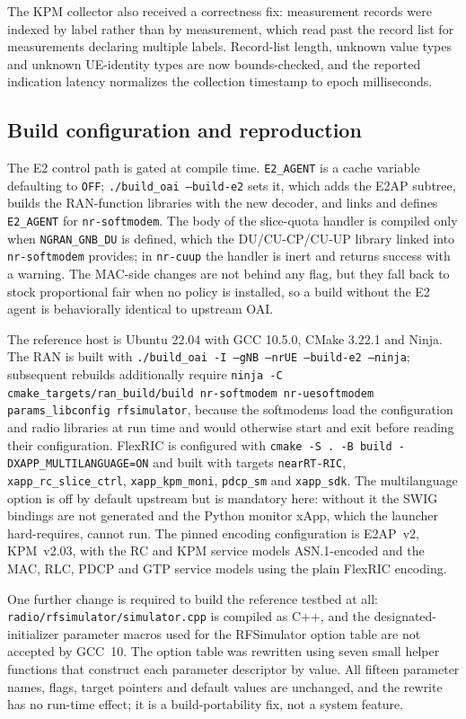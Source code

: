 The KPM collector also received a correctness fix: measurement records were indexed by label rather than by measurement, which read past the record list for measurements declaring multiple labels. Record-list length, unknown value types and unknown UE-identity types are now bounds-checked, and the reported indication latency normalizes the collection timestamp to epoch milliseconds.

\subsection{Build configuration and reproduction}
The E2 control path is gated at compile time. \texttt{E2\_AGENT} is a cache variable defaulting to \texttt{OFF}; \texttt{./build\_oai --build-e2} sets it, which adds the E2AP subtree, builds the RAN-function libraries with the new decoder, and links and defines \texttt{E2\_AGENT} for \texttt{nr-softmodem}. The body of the slice-quota handler is compiled only when \texttt{NGRAN\_GNB\_DU} is defined, which the DU/CU-CP/CU-UP library linked into \texttt{nr-softmodem} provides; in \texttt{nr-cuup} the handler is inert and returns success with a warning. The MAC-side changes are not behind any flag, but they fall back to stock proportional fair when no policy is installed, so a build without the E2 agent is behaviorally identical to upstream OAI.

The reference host is Ubuntu 22.04 with GCC 10.5.0, CMake 3.22.1 and Ninja. The RAN is built with \texttt{./build\_oai -I --gNB --nrUE --build-e2 --ninja}; subsequent rebuilds additionally require \texttt{ninja -C cmake\_targets/ran\_build/build nr-softmodem nr-uesoftmodem params\_libconfig rfsimulator}, because the softmodems load the configuration and radio libraries at run time and would otherwise start and exit before reading their configuration. FlexRIC is configured with \texttt{cmake -S . -B build -DXAPP\_MULTILANGUAGE=ON} and built with targets \texttt{nearRT-RIC}, \texttt{xapp\_rc\_slice\_ctrl}, \texttt{xapp\_kpm\_moni}, \texttt{pdcp\_sm} and \texttt{xapp\_sdk}. The multilanguage option is off by default upstream but is mandatory here: without it the SWIG bindings are not generated and the Python monitor xApp, which the launcher hard-requires, cannot run. The pinned encoding configuration is E2AP~v2, KPM~v2.03, with the RC and KPM service models ASN.1-encoded and the MAC, RLC, PDCP and GTP service models using the plain FlexRIC encoding.

One further change is required to build the reference testbed at all: \texttt{radio/rfsimulator/simulator.cpp} is compiled as C++, and the designated-initializer parameter macros used for the RFSimulator option table are not accepted by GCC~10. The option table was rewritten using seven small helper functions that construct each parameter descriptor by value. All fifteen parameter names, flags, target pointers and default values are unchanged, and the rewrite has no run-time effect; it is a build-portability fix, not a system feature.

